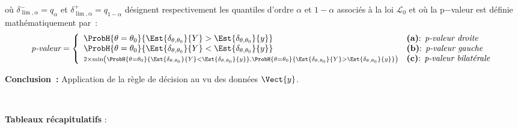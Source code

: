 \documentclass[10pt]{article}
\begin{document}
\begin{minipage}{15cm}
{\begin{minipage}{15cm}
o{\`u} $\delta^{-}_{\lim,\alpha}=q_{\alpha}$ et $\delta^{+}_{\lim,\alpha}=q_{1-\alpha}$ d{\'e}signent respectivement les quantiles d'ordre $\alpha$ et $1-\alpha$ associ{\'e}s {\`a} la loi $\mathcal{L}_0$ et o{\`u} la p$-$valeur est d{\'e}finie math{\'e}matiquement par~:
$$ \mbox{\it p-valeur} = \left\{ \begin{array}{ll}
\ProbH{\theta=\theta_0}{ \Est{\delta_{\theta,\theta_0}} {Y} >\Est{\delta_{\theta,\theta_0}} {y}}  & \mbox{\textbf{(a)}: {\it p-valeur droite}} \\
\ProbH{\theta=\theta_0}{ \Est{\delta_{\theta,\theta_0}} {Y} <\Est{\delta_{\theta,\theta_0}} {y}}  & \mbox{\textbf{(b)}: {\it p-valeur gauche}}\\
{\scriptstyle 2  \times \min \left( \ProbH{\theta=\theta_0}{ \Est{\delta_{\theta,\theta_0}} {Y} <\Est{\delta_{\theta,\theta_0}} {y}} ,  \ProbH{\theta=\theta_0}{ \Est{\delta_{\theta,\theta_0}} {Y} >\Est{\delta_{\theta,\theta_0}} {y}} \right) } & \mbox{\textbf{(c)}: {\it p-valeur bilatérale}} 
\end{array} \right.$$


\noindent \textbf{Conclusion~:} Application de la r{\`e}gle de d{\'e}cision au vu des donn{\'e}es $\Vect{y}$.

\end{minipage}}\end{minipage}
 \\

\bigskip



\vspace*{1cm}
\noindent\textbf{Tableaux récapitulatifs} :
\end{document}
